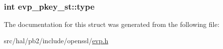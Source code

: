 \subsubsection[{\texorpdfstring{type}{type}}]{\setlength{\rightskip}{0pt plus 5cm}int evp\+\_\+pkey\+\_\+st\+::type}\hypertarget{structevp__pkey__st_a7d550d554ff45db26681e2d2e2f23b66}{}\label{structevp__pkey__st_a7d550d554ff45db26681e2d2e2f23b66}


The documentation for this struct was generated from the following file\+:\begin{DoxyCompactItemize}
\item 
src/hal/pb2/include/openssl/\hyperlink{evp_8h}{evp.\+h}\end{DoxyCompactItemize}
